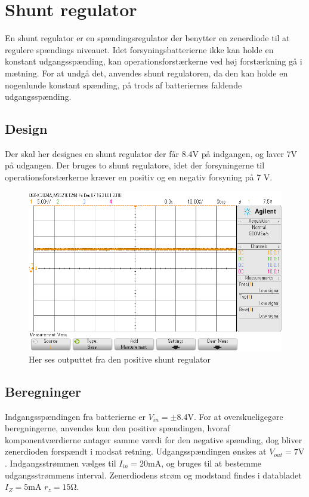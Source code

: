 \section{Shunt regulator}\label{sec:shunt}
En shunt regulator er en spændingsregulator der benytter en zenerdiode til at regulere spændings niveauet.
Idet forsyningsbatterierne ikke kan holde en konstant udgangsspænding, kan operationsforstærkerne ved høj forstærkning gå i mætning. 
For at undgå det, anvendes shunt regulatoren, da den kan holde en nogenlunde konstant spænding, på trods af batteriernes faldende udgangsspænding.

\subsection{Design}
Der skal her designes en shunt regulator der får $8.4 \si{\volt}$ på indgangen, og laver $7\si{\volt}$ på udgangen.
Der bruges to shunt regulatore, idet der forsyningerne til operationsforstærkerne kræver en positiv og en negativ forsyning på 7 \si{\volt}.
\begin{figure}[h!]
	\centering
	\includegraphics[width=1\textwidth]{billeder/shunt_pos_png.png}
	\caption{Her ses outputtet fra den positive shunt regulator}
	\label{fig:positiv_shunt}
\end{figure}
\subsection{Beregninger}
Indgangsspændingen fra batterierne er $V_{in} = \pm 8.4 \si{\volt}$. 
For at overskueligegøre beregningerne, anvendes kun den positive spændingen, hvoraf komponentværdierne antager samme værdi for den negative spænding, dog bliver zenerdioden forspændt i modsat retning.
Udgangsspændingen ønskes at $V_{out} = 7 \si{\volt}$. 
Indgangsstrømmen vælges til $I_{in} = 20\si{\milli\ampere}$, og bruges til at bestemme udgangsstrømmens interval.
Zenerdiodens strøm og modstand findes i databladet $I_Z = 5 \si{\milli\ampere}$ $r_z = 15 \si{\ohm}$. \cite[Side. 1 Kolonne 12]{ZenerDiode}

